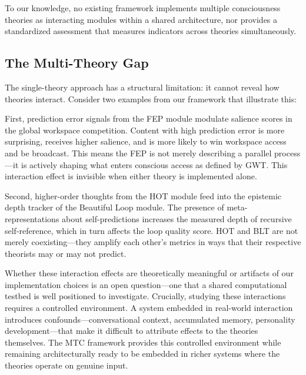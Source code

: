 To our knowledge, no existing framework implements multiple consciousness theories as interacting modules within a shared architecture, nor provides a standardized assessment that measures indicators across theories simultaneously.

\subsection{The Multi-Theory Gap}

The single-theory approach has a structural limitation: it cannot reveal how theories interact. Consider two examples from our framework that illustrate this:

First, prediction error signals from the FEP module modulate salience scores in the global workspace competition. Content with high prediction error is more surprising, receives higher salience, and is more likely to win workspace access and be broadcast. This means the FEP is not merely describing a parallel process---it is actively shaping what enters conscious access as defined by GWT. This interaction effect is invisible when either theory is implemented alone.

Second, higher-order thoughts from the HOT module feed into the epistemic depth tracker of the Beautiful Loop module. The presence of meta-representations about self-predictions increases the measured depth of recursive self-reference, which in turn affects the loop quality score. HOT and BLT are not merely coexisting---they amplify each other's metrics in ways that their respective theorists may or may not predict.

Whether these interaction effects are theoretically meaningful or artifacts of our implementation choices is an open question---one that a shared computational testbed is well positioned to investigate. Crucially, studying these interactions requires a controlled environment. A system embedded in real-world interaction introduces confounds---conversational context, accumulated memory, personality development---that make it difficult to attribute effects to the theories themselves. The MTC framework provides this controlled environment while remaining architecturally ready to be embedded in richer systems where the theories operate on genuine input.
